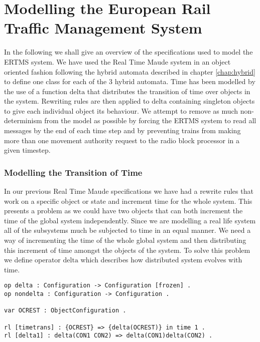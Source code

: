 \section{Modelling the European Rail Traffic Management System}
In the following we shall give an overview of the specifications used to model the ERTMS system. We have used the Real Time Maude system in an object oriented fashion following the hybrid automata described in chapter \ref{chap:hybrid} to define one class for each of the 3 hybrid automata. Time has been modelled by the use of a function $\mathrm{delta}$ that distributes the transition of time over objects in the system. Rewriting rules are then applied to $\mathrm{delta}$ containing singleton objects to give each individual object its behaviour. We attempt to remove as much non-determinism from the model as possible by forcing the ERTMS system to read all messages by the end of each time step and by preventing trains from making more than one movement authority request to the radio block processor in a given timestep.


\subsubsection*{Modelling the Transition of Time}
In our previous Real Time Maude specifications we have had a rewrite rules that work on a specific object or state and increment time for the whole system. This presents a problem as we could have two objects that can both increment the time of the global system independently.  Since we are modelling a real life system all of the subsystems much be subjected to time in an equal manner. We need a way of incrementing the time of the whole global system and then distributing this increment of time amongst the objects of the system. To solve this problem we define operator $\mathrm{delta}$ which describes how distributed system evolves with time.

\begin{lstlisting}[caption = The delta time transition operation, label = code:delta]
op delta : Configuration -> Configuration [frozen] . 
op nondelta : Configuration -> Configuration .

var OCREST : ObjectConfiguration .

rl [timetrans] : {OCREST} => {delta(OCREST)} in time 1 .
rl [delta1] : delta(CON1 CON2) => delta(CON1)delta(CON2) .
\end{lstlisting}

